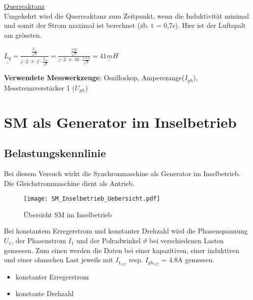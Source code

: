 \begin{flushleft}
\newpage




\underline{Querreaktanz}\\
\vspace{0.2cm}
Umgekehrt wird die Querreaktanz zum Zeitpunkt, wenn die Induktivität minimal und somit der Strom maximal ist berechnet (zb. t = 0,7s). Hier ist der Luftspalt am grössten.

\begin{center}
\begin{Large}
$ \underline{\underline{L_q}}= \frac{\frac{\hat{U}_1}{\sqrt{2}}}{j \cdot 2 \cdot \pi \cdot f \cdot \frac{\hat{I}_{ph}}{\sqrt{2}} }  = \frac{\frac{75 V}{\sqrt{2}}}{j \cdot 2 \cdot \pi \cdot 50 \cdot \frac{5.8 A}{\sqrt{2}} } = \underline{\underline{41 mH}}$\\
\end{Large}
\end{center}


\vspace{0.4cm}
\textbf{Verwendete Messwerkzeuge}:  Oszilloskop, Amperezange($I_{ph}$),\\ Messtrennverstärker 1 ($U_{ph}$) 


\newpage
\section{SM als Generator im Inselbetrieb}\label{inselbetrieb}
\subsection{Belastungskennlinie}
Bei diesem Versuch wirkt die Synchronmaschine als Generator im Inselbetrieb. Die Gleichstrommaschine dient als Antrieb.
\vspace{0.3cm}
\begin{figure}[H]
    \centering
        \texttt{[image: SM\_Inselbetrieb\_Uebersicht.pdf]}
    \caption{Übersicht SM im Inselbetrieb}
    \label{fig:SMInselbetrieb}
\end{figure}
\vspace{0.3cm}
Bei konstantem  Erregerstrom und konstanter Drehzahl wird die Phasenspannung $U_1$, der Phasenstrom $I_1$ und der Polradwinkel $\vartheta$ bei verschiedenen Lasten gemessen. Zum einen werden die Daten bei einer kapazitiven, einer induktiven und einer ohmschen Last jeweils mit $I_{1_{eff}}$ resp. $I_{ph_{eff}}$ = 4.8A gemessen.

\begin{itemize}
\item {}            konstanter Erregerstrom
\item {}				konstante Drehzahl
\end{itemize}



\end{flushleft}
